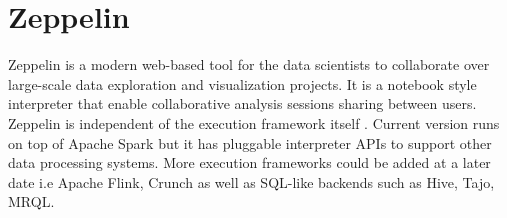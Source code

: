 \section{Zeppelin}

Zeppelin \cite{Zeppelin} is a modern web-based tool for the data scientists to
collaborate over large-scale data exploration and visualization projects. It is
a notebook style  interpreter that enable collaborative
analysis sessions sharing between users. Zeppelin is independent of the
execution framework itself \cite{notebooks}. Current version runs on top of
Apache  Spark but it has pluggable interpreter APIs to support
other data processing systems. More execution frameworks could be added at a
later date i.e Apache Flink, Crunch as well as SQL-like backends such as Hive,
Tajo, MRQL.
